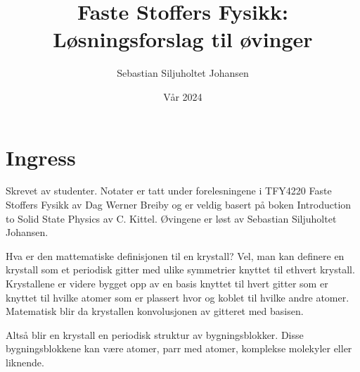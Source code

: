 \documentclass{article}
\title{Faste Stoffers Fysikk: Løsningsforslag til øvinger}
\author{Sebastian Siljuholtet Johansen}
\date{Vår 2024}
\begin{document}
\maketitle

\newpage
\section*{Ingress}
Skrevet av studenter. Notater er tatt under forelesningene i TFY4220 Faste Stoffers Fysikk av Dag Werner Breiby og er veldig basert på boken Introduction to Solid State Physics av C. Kittel. Øvingene er løst av Sebastian Siljuholtet Johansen.

\newpage
\tableofcontents

\newpage
{}
Hva er den mattematiske definisjonen til en krystall? Vel, man kan definere en krystall som et periodisk gitter med ulike symmetrier knyttet til ethvert krystall. Krystallene er videre bygget opp av en basis knyttet til hvert gitter som er knyttet til hvilke atomer som er plassert hvor og koblet til hvilke andre atomer. Matematisk blir da krystallen konvolusjonen av gitteret med basisen.

Altså blir en krystall en periodisk struktur av bygningsblokker. Disse bygningsblokkene kan være atomer, parr med atomer, komplekse molekyler eller liknende.
\end{document}
